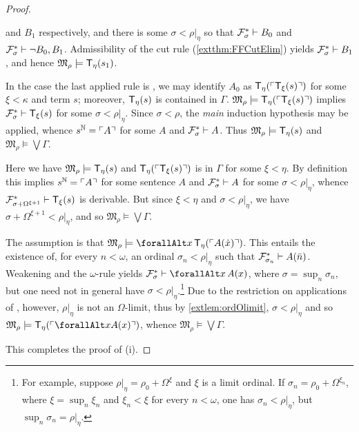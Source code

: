 \documentclass[UKenglish,cleveref,DIV=12]{scrartcl}
\let\forall\forallAlt
\theoremstyle{definition}
\theoremstyle{definition}
\begin{document}
\begin{proof}
\begin{description}
  and $B_1$ respectively, and there is some $\sigma<\rho|_\eta$ so
  that $\mathcal{F}^*_\sigma\vdash B_0$ and $\mathcal{F}^*_\sigma\vdash\lnot B_0,B_1$.
  Admissibility of the cut rule (\cref{extthm:FFCutElim}) yields $\mathcal{F}^*_\sigma\vdash B_1$, and hence
  $\mathfrak{M}_\rho\models \mathsf{T}_\eta(s_1)$.
\item [\normalfont\Del\eta.] In the case the last applied rule is \Del\eta,
  we may identify $A_0$ as $\mathsf{T}_\eta(\ulcorner{\mathsf{T}_\xi(s)}\urcorner)$ for some $\xi<\kappa$
  and  term $s$; moreover, $\mathsf{T}_\eta(s)$ is contained in $\Gamma$.
  $\mathfrak{M}_\rho\models \mathsf{T}_\eta(\ulcorner{\mathsf{T}_\xi(s)}\urcorner)$ implies $\mathcal{F}^*_\sigma\vdash
  \mathsf{T}_\xi(s)$ for some $\sigma<\rho|_\eta$. Since $\sigma<\rho$, the
  {\em  main} induction hypothesis may be applied, whence $s^\mathbb N=\ulcorner{A}\urcorner$ for some $A$
  and  $\mathcal{F}^*_\sigma\vdash A$. Thus $\mathfrak{M}_\rho\models \mathsf{T}_\eta(s)$ and
  $\mathfrak{M}_\rho\models\bigvee\Gamma$.
\item [\normalfont{}\Rep\eta.] Here we have $\mathfrak{M}_\rho\models \mathsf{T}_\eta(s)$ and
  $\mathsf{T}_\eta(\ulcorner{\mathsf{T}_\xi(s)}\urcorner)$ is in $\Gamma$ for some $\xi<\eta$. By definition this
  implies $s^\mathbb N=\ulcorner{A}\urcorner$ for some sentence $A$ and $\mathcal{F}^*_\sigma\vdash A$ for some
  $\sigma<\rho|_\eta$, whence $\mathcal{F}^*_{\sigma+\Omega^{\xi+1}}\vdash \mathsf{T}_\xi(s)$ is
  derivable. But since $\xi<\eta$ and $\sigma<\rho|_\eta$, we have
  $\sigma+\Omega^{\xi+1}<\rho|_\eta$, and so $\mathfrak{M}_\rho\models \bigvee\Gamma$.
\item [\normalfont{}\Uni\eta.] The assumption is that
  $\mathfrak{M}_\rho\models\forall x\,\T_\eta(\gn{A(\dot x)})$. This entails the
  existence of, for every $n<\omega$, an ordinal $\sigma_n<\rho|_\eta$ such that
  $\mathcal{F}^*_{\sigma_n}\vdash A(\bar n)$. Weakening and the $\omega$-rule yields
  $\FF^*_\sigma\proves \forall x\,A(x)$, where $\sigma=\sup_n{\sigma_n}$, but
  one need not in general have $\sigma<\rho|_\eta$.\footnote{For example,
  suppose $\rho|_\eta=\rho_0+\Omega^\xi$ and $\xi$ is a limit ordinal. If
  $\sigma_n= \rho_0+\Omega^{\xi_n}$, where $\xi=\sup_n\xi_n$ and
  $\xi_n<\xi$ for every  $n<\omega$, one has $\sigma_n<\rho|_\eta$, but
  $\sup_n\sigma_n=\rho|_\eta$.} Due to the restriction on applications of
  \Uni\eta, however, $\rho|_\eta$ is not an $\Omega$-limit,
  thus by \cref{extlem:ordOlimit}, $\sigma<\rho|_\eta$ and so
  $\mathfrak{M}_\rho\models \T_\eta(\gn{\forall xA(x)})$, whence
  $\mathfrak{M}_\rho\models\bigvee\Gamma$.
\end{description}
This completes the proof of (i).


\end{proof}
\end{document}
